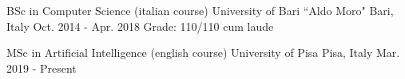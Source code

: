 

\begin{cventries}

  \cventry
    {BSc in Computer Science (italian course)} %
    {University of Bari ``Aldo Moro"} %
    {Bari, Italy} %
    {Oct. 2014 - Apr. 2018} %
    {Grade: 110/110 cum laude}
    
  \cventry
    {MSc in Artificial Intelligence (english course)} %
    {University of Pisa} %
    {Pisa, Italy} %
    {Mar. 2019 - Present} %
    {}

\end{cventries}

